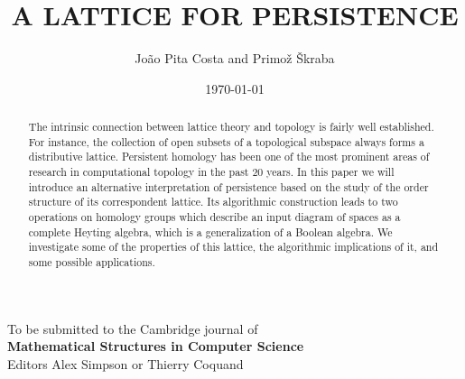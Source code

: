 \documentclass[10pt]{amsart}
\begin{document}
\title{
\textbf{A LATTICE FOR PERSISTENCE}
}

\author{Jo\~ao Pita Costa and Primo\v z \v Skraba}

\address{In\v stitut Jo\v zef Stefan,\\
Jamova Cesta 39, 1000 Ljubljana, Slovenia.
}
\date{\today}

\maketitle


\begin{center}

To be submitted to the Cambridge journal of \\
\textbf{Mathematical Structures in Computer Science} \\
Editors Alex Simpson or Thierry Coquand
\medskip

\end{center}



\begin{abstract} 
The intrinsic connection between lattice theory and topology is fairly well established.
For instance, the collection of open subsets of a topological subspace always forms a distributive lattice. 
Persistent homology has been one of the most prominent areas of research in computational topology in the past 20 years.
In this paper we will introduce an alternative interpretation of persistence based on the study of the order structure of its correspondent lattice. 
Its algorithmic construction leads to two operations on homology groups which describe an input diagram of spaces as a complete Heyting
algebra, which is a generalization of a Boolean algebra.  
We investigate some of the properties of this lattice, the algorithmic implications of it, and some possible applications.
\end{abstract}



%
%
%
%
%
%
%
%


\end{document}
